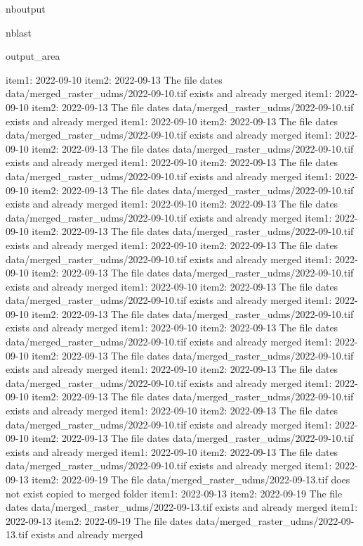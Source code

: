 \documentclass[letterpaper,10pt]{sphinxmanual}
\begin{document}
\begin{sphinxuseclass}{nboutput}
\begin{sphinxuseclass}{nblast}
{\begin{sphinxuseclass}{output_area}
\begin{sphinxuseclass}{}
\begin{sphinxVerbatim}[commandchars=\\\{\}]
item1:  2022-09-10
item2:  2022-09-13
The file dates data/merged\_raster\_udms/2022-09-10.tif exists and already merged
item1:  2022-09-10
item2:  2022-09-13
The file dates data/merged\_raster\_udms/2022-09-10.tif exists and already merged
item1:  2022-09-10
item2:  2022-09-13
The file dates data/merged\_raster\_udms/2022-09-10.tif exists and already merged
item1:  2022-09-10
item2:  2022-09-13
The file dates data/merged\_raster\_udms/2022-09-10.tif exists and already merged
item1:  2022-09-10
item2:  2022-09-13
The file dates data/merged\_raster\_udms/2022-09-10.tif exists and already merged
item1:  2022-09-10
item2:  2022-09-13
The file dates data/merged\_raster\_udms/2022-09-10.tif exists and already merged
item1:  2022-09-10
item2:  2022-09-13
The file dates data/merged\_raster\_udms/2022-09-10.tif exists and already merged
item1:  2022-09-10
item2:  2022-09-13
The file dates data/merged\_raster\_udms/2022-09-10.tif exists and already merged
item1:  2022-09-10
item2:  2022-09-13
The file dates data/merged\_raster\_udms/2022-09-10.tif exists and already merged
item1:  2022-09-10
item2:  2022-09-13
The file dates data/merged\_raster\_udms/2022-09-10.tif exists and already merged
item1:  2022-09-10
item2:  2022-09-13
The file dates data/merged\_raster\_udms/2022-09-10.tif exists and already merged
item1:  2022-09-10
item2:  2022-09-13
The file dates data/merged\_raster\_udms/2022-09-10.tif exists and already merged
item1:  2022-09-10
item2:  2022-09-13
The file dates data/merged\_raster\_udms/2022-09-10.tif exists and already merged
item1:  2022-09-10
item2:  2022-09-13
The file dates data/merged\_raster\_udms/2022-09-10.tif exists and already merged
item1:  2022-09-10
item2:  2022-09-13
The file dates data/merged\_raster\_udms/2022-09-10.tif exists and already merged
item1:  2022-09-10
item2:  2022-09-13
The file dates data/merged\_raster\_udms/2022-09-10.tif exists and already merged
item1:  2022-09-10
item2:  2022-09-13
The file dates data/merged\_raster\_udms/2022-09-10.tif exists and already merged
item1:  2022-09-10
item2:  2022-09-13
The file dates data/merged\_raster\_udms/2022-09-10.tif exists and already merged
item1:  2022-09-10
item2:  2022-09-13
The file dates data/merged\_raster\_udms/2022-09-10.tif exists and already merged
item1:  2022-09-13
item2:  2022-09-19
The file data/merged\_raster\_udms/2022-09-13.tif does not exist copied to merged folder
item1:  2022-09-13
item2:  2022-09-19
The file dates data/merged\_raster\_udms/2022-09-13.tif exists and already merged
item1:  2022-09-13
item2:  2022-09-19
The file dates data/merged\_raster\_udms/2022-09-13.tif exists and already merged

\end{sphinxVerbatim}
\end{sphinxuseclass}
\end{sphinxuseclass}}
\end{sphinxuseclass}
\end{sphinxuseclass}
\end{document}
